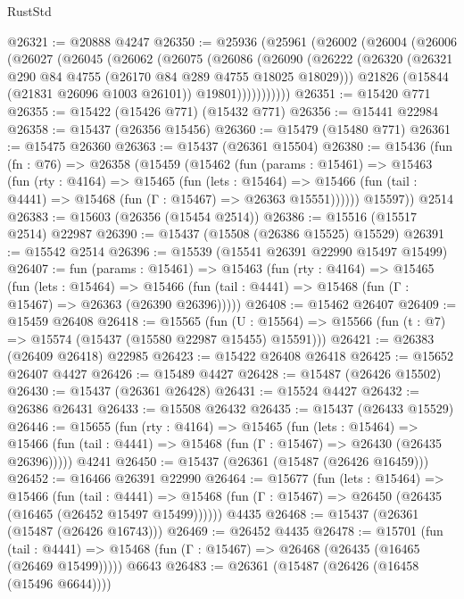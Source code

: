 \begin{lexlean}{RustStd}
\begin{coremodule}
@26321 := @20888 @4247
@26350 := @25936
    (@25961
      (@26002
        (@26004
          (@26006
            (@26027
              (@26045
                (@26062
                  (@26075
                    (@26086
                      (@26090
                        (@26222
                          (@26320 (@26321 @290 @84 @4755 (@26170 @84 @289 @4755 @18025 @18029)))
                          @21826
                          (@15844 (@21831 @26096 @1003 @26101))
                          @19801)))))))))))
@26351 := @15420 @771
@26355 := @15422 (@15426 @771) (@15432 @771)
@26356 := @15441 @22984
@26358 := @15437 (@26356 @15456)
@26360 := @15479 (@15480 @771)
@26361 := @15475 @26360
@26363 := @15437 (@26361 @15504)
@26380 := @15436
    (fun (fn : @76) =>
    @26358
      (@15459
        (@15462
          (fun (params : @15461) =>
          @15463
            (fun (rty : @4164) =>
            @15465
              (fun (lets : @15464) =>
              @15466 (fun (tail : @4441) => @15468 (fun (Γ : @15467) => @26363 @15551))))))
        @15597))
    @2514
@26383 := @15603 (@26356 (@15454 @2514))
@26386 := @15516 (@15517 @2514) @22987
@26390 := @15437 (@15508 (@26386 @15525) @15529)
@26391 := @15542 @2514
@26396 := @15539 (@15541 @26391 @22990 @15497 @15499)
@26407 := fun (params : @15461) =>
  @15463
    (fun (rty : @4164) =>
    @15465
      (fun (lets : @15464) =>
      @15466 (fun (tail : @4441) => @15468 (fun (Γ : @15467) => @26363 (@26390 @26396)))))
@26408 := @15462 @26407
@26409 := @15459 @26408
@26418 := @15565
    (fun (U : @15564) => @15566 (fun (t : @7) => @15574 (@15437 (@15580 @22987 @15455) @15591)))
@26421 := @26383 (@26409 @26418) @22985
@26423 := @15422 @26408 @26418
@26425 := @15652 @26407 @4427
@26426 := @15489 @4427
@26428 := @15487 (@26426 @15502)
@26430 := @15437 (@26361 @26428)
@26431 := @15524 @4427
@26432 := @26386 @26431
@26433 := @15508 @26432
@26435 := @15437 (@26433 @15529)
@26446 := @15655
    (fun (rty : @4164) =>
    @15465
      (fun (lets : @15464) =>
      @15466 (fun (tail : @4441) => @15468 (fun (Γ : @15467) => @26430 (@26435 @26396)))))
    @4241
@26450 := @15437 (@26361 (@15487 (@26426 @16459)))
@26452 := @16466 @26391 @22990
@26464 := @15677
    (fun (lets : @15464) =>
    @15466
      (fun (tail : @4441) =>
      @15468 (fun (Γ : @15467) => @26450 (@26435 (@16465 (@26452 @15497 @15499))))))
    @4435
@26468 := @15437 (@26361 (@15487 (@26426 @16743)))
@26469 := @26452 @4435
@26478 := @15701
    (fun (tail : @4441) => @15468 (fun (Γ : @15467) => @26468 (@26435 (@16465 (@26469 @15499)))))
    @6643
@26483 := @26361 (@15487 (@26426 (@16458 (@15496 @6644))))

\end{coremodule}
\end{lexlean}
